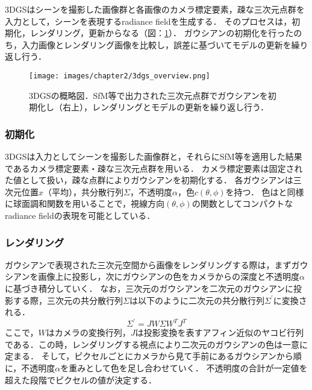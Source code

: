 3DGSはシーンを撮影した画像群と各画像のカメラ標定要素，疎な三次元点群を入力として，シーンを表現するradiance fieldを生成する．
そのプロセスは，初期化，レンダリング，更新からなる（図：\ref{fig:3dgs_overview}）．
ガウシアンの初期化を行ったのち，入力画像とレンダリング画像を比較し，誤差に基づいてモデルの更新を繰り返し行う．
\begin{figure}[h]
  \centering
  \texttt{[image: images/chapter2/3dgs\_overview.png]}
  \caption[3DGSの概略図]{3DGSの概略図．SfM等で出力された三次元点群でガウシアンを初期化し（右上），レンダリングとモデルの更新を繰り返し行う．}
  \label{fig:3dgs_overview}
\end{figure}

\subsubsection*{初期化}
3DGSは入力としてシーンを撮影した画像群と，それらにSfM等を適用した結果であるカメラ標定要素・疎な三次元点群を用いる．
カメラ標定要素は固定された値として扱い，疎な点群によりガウシアンを初期化する．
各ガウシアンは三次元位置$x$（平均），共分散行列$\Sigma$，不透明度$\alpha$，色$c(\theta, \phi)$を持つ．
色は\cite{plenoxels}\cite{instant-ngp}と同様に球面調和関数を用いることで，視線方向$(\theta, \phi)$の関数としてコンパクトなradiance fieldの表現を可能としている．\par

\subsubsection*{レンダリング}
ガウシアンで表現された三次元空間から画像をレンダリングする際は，まずガウシアンを画像上に投影し，次にガウシアンの色をカメラからの深度と不透明度$\alpha$に基づき積分していく．
なお，三次元のガウシアンを二次元のガウシアンに投影する際，三次元の共分散行列$\Sigma$は以下のように二次元の共分散行列$\Sigma^{\prime}$に変換される．
\begin{equation}
  \Sigma^{\prime}=J W \Sigma W^T J^T
\end{equation}
ここで，$W$はカメラの変換行列，$J$は投影変換を表すアフィン近似のヤコビ行列である．この時，レンダリングする視点により二次元のガウシアンの色は一意に定まる．
そして，ピクセルごとにカメラから見て手前にあるガウシアンから順に，不透明度$\alpha$を重みとして色を足し合わせていく．
不透明度の合計が一定値を超えた段階でピクセルの値が決定する．\par

